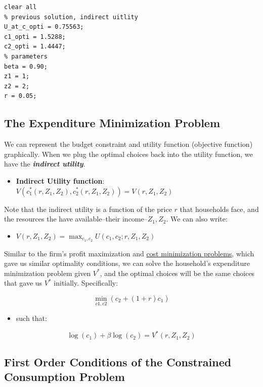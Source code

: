 \documentclass[
]{book}
\providecommand{\tightlist}{%
  \setlength{\itemsep}{0pt}\setlength{\parskip}{0pt}}
\begin{document}
\begin{verbatim}
clear all
% previous solution, indirect uitlity
U_at_c_opti = 0.75563;
c1_opti = 1.5288;
c2_opti = 1.4447;
% parameters
beta = 0.90;
z1 = 1;
z2 = 2;
r = 0.05;
\end{verbatim}

\hypertarget{the-expenditure-minimization-problem}{%
\subsection{The Expenditure Minimization Problem}\label{the-expenditure-minimization-problem}}

We can represent the budget constraint and utility function (objective
function) graphically. When we plug the optimal choices back into the
utility function, we have the \textbf{\emph{indirect utility}}.

\begin{itemize}
\tightlist
\item
  \textbf{Indirect Utility function}:
  \(V(c_1^* (r,Z_1 ,Z_2 ),c_2^* (r,Z_1 ,Z_2 ))=V(r,Z_1 ,Z_2 )\)
\end{itemize}

Note that the indirect utility is a function of the price \(r\) that
households face, and the resources the have available--their
income--\(Z_1 ,Z_2\). We can also write:

\begin{itemize}
\tightlist
\item
  \(\displaystyle V(r,Z_1 ,Z_2 )=\max_{c_1 ,c_2 } U(c_1 ,c_2 ;r,Z_1 ,Z_2 )\)
\end{itemize}

Similar to the firm's profit maximization and \href{https://fanwangecon.github.io/Math4Econ/opti_firm_constrained/profit_maximize.html}{cost minimization
problems},
which gave us similar optimality conditions, we can solve the
household's expenditure minimization problem given \(V^*\), and the
optimal choices will be the same choices that gave us \(V^*\) initially.
Specifically:

\[\min_{c1,c2} \left(c_2 +(1+r)c_1 \right)\]

\begin{itemize}
\tightlist
\item
  such that:
\end{itemize}

\[\log (c_1 )+\beta \log (c_2 )=V^{\ast } (r,Z_1 ,Z_2 )\]

\hypertarget{first-order-conditions-of-the-constrained-consumption-problem-1}{%
\subsection{First Order Conditions of the Constrained Consumption Problem}\label{first-order-conditions-of-the-constrained-consumption-problem-1}}
\end{document}
